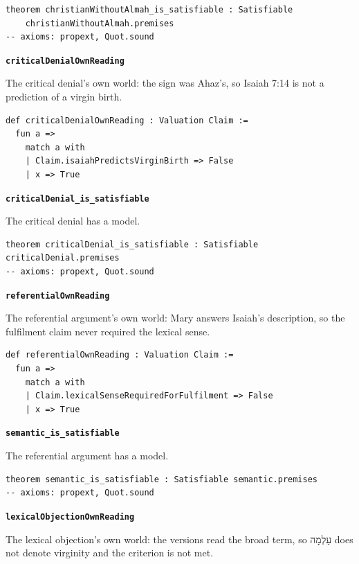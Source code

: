 \documentclass[11pt]{article}
\begin{document}
{\small\begin{verbatim}
theorem christianWithoutAlmah_is_satisfiable : Satisfiable
    christianWithoutAlmah.premises
-- axioms: propext, Quot.sound
\end{verbatim}}
\par\medskip\noindent\textbf{\texttt{critical\allowbreak{}Denial\allowbreak{}Own\allowbreak{}Reading}}\par\nobreak\noindent
The critical denial's own world: the sign was Ahaz's, so Isaiah 7:14 is not a prediction of a virgin birth.

{\small\begin{verbatim}
def criticalDenialOwnReading : Valuation Claim :=
  fun a =>
    match a with
    | Claim.isaiahPredictsVirginBirth => False
    | x => True
\end{verbatim}}
\par\medskip\noindent\textbf{\texttt{critical\allowbreak{}Denial\_\allowbreak{}is\_\allowbreak{}satisfiable}}\par\nobreak\noindent
The critical denial has a model.

{\small\begin{verbatim}
theorem criticalDenial_is_satisfiable : Satisfiable criticalDenial.premises
-- axioms: propext, Quot.sound
\end{verbatim}}
\par\medskip\noindent\textbf{\texttt{referential\allowbreak{}Own\allowbreak{}Reading}}\par\nobreak\noindent
The referential argument's own world: Mary answers Isaiah's description, so the fulfilment claim never required the lexical sense.

{\small\begin{verbatim}
def referentialOwnReading : Valuation Claim :=
  fun a =>
    match a with
    | Claim.lexicalSenseRequiredForFulfilment => False
    | x => True
\end{verbatim}}
\par\medskip\noindent\textbf{\texttt{semantic\_\allowbreak{}is\_\allowbreak{}satisfiable}}\par\nobreak\noindent
The referential argument has a model.

{\small\begin{verbatim}
theorem semantic_is_satisfiable : Satisfiable semantic.premises
-- axioms: propext, Quot.sound
\end{verbatim}}
\par\medskip\noindent\textbf{\texttt{lexical\allowbreak{}Objection\allowbreak{}Own\allowbreak{}Reading}}\par\nobreak\noindent
The lexical objection's own world: the versions read the broad term, so עַלְמָה does not denote virginity and the criterion is not met.
\end{document}
